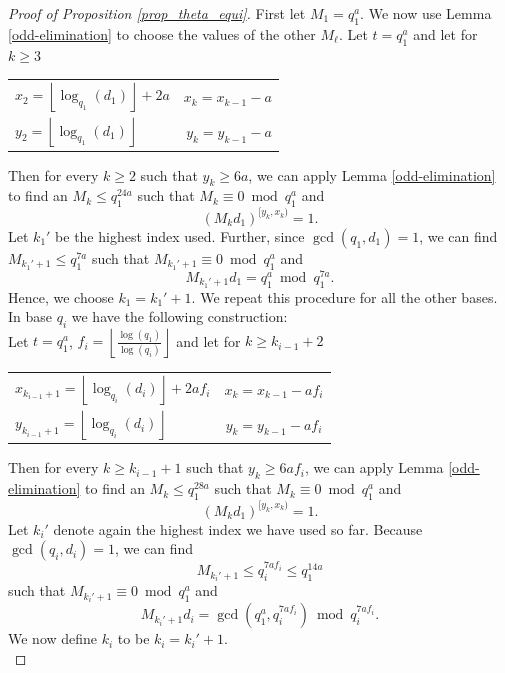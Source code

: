 \documentclass[12pt]{amsart}
\renewcommand{\leq}{\leqslant}
\renewcommand{\geq}{\geqslant}
\theoremstyle{definition}
\numberwithin{equation}{section}
\numberwithin{equation}{section}
\begin{document}
\begin{proof}[Proof of Proposition \ref{prop_theta_equi}]
	First let $M_1=q_1^{a}$. We now use Lemma \ref{odd-elimination} to choose the values of the other $M_{\ell}$. Let $t=q_1^{a}$ and let for $k\geq 3$\\
	\begin{center}
		\begin{tabular}{lr}
			\vspace{3pt}$x_2=\left\lfloor\log_{q_1}(d_1)\right\rfloor + 2a$ & \hspace{10pt} $x_k=x_{k-1}-a$\\
			$y_2=\left\lfloor\log_{q_1}(d_1)\right\rfloor$ & \hspace{10pt} $y_k=y_{k-1}-a$
		\end{tabular}
	\end{center}
	Then for every $k\geq 2$ such that $y_k\geq 6a$, we can apply Lemma \ref{odd-elimination} to find an $M_k\leq q_1^{24a}$ such that $M_k\equiv 0 \bmod q_1^{a}$ and
	\[
		(M_kd_1)^{[y_k,x_k)} = 1.
	\]
	Let $k_1'$ be the highest index used. Further, since $\gcd(q_1,d_1)=1$, we can find $M_{k_1'+1}\leq q_1^{7a}$ such that $M_{k_1'+1}\equiv0\bmod q_1^a$ and 
	\[
		M_{k_1'+1}d_1=q_1^a \bmod q_1^{7a}.
	\]
	Hence, we choose $k_1=k_1'+1$. We repeat this procedure for all the other bases. In base $q_{i}$ we have the following construction:\\
	Let $t=q_1^{a}$, $f_i = \left\lfloor\frac{\log(q_1)}{\log(q_i)}\right\rfloor$ and let for $k\geq k_{i-1}+2$\\
	\begin{center}
		\begin{tabular}{lc}
			\vspace{3pt}$x_{k_{i-1}+1}=\left\lfloor\log_{q_i}(d_i)\right\rfloor + 2af_i$ & $x_k=x_{k-1}-af_i$\\
			$y_{k_{i-1}+1}=\left\lfloor\log_{q_i}(d_i)\right\rfloor$ & $y_k=y_{k-1}-af_i$
		\end{tabular}
	\end{center}
	Then for every $k\geq k_{i-1}+1$ such that $y_k\geq 6af_i$, we can apply Lemma \ref{odd-elimination} to find an $M_k\leq q_1^{28a}$ such that $M_k\equiv 0 \bmod q_1^{a}$ and
	\[
		(M_kd_1)^{[y_k,x_k)} = 1.
	\]
	Let $k_i'$ denote again the highest index we have used so far. Because $\gcd(q_i,d_i)=1$, we can find 
	\[
		M_{k_i'+1}\leq q_i^{7af_i} \leq q_1^{14a}
	\]
	such that $M_{k_i'+1}\equiv0\bmod q_1^a$ and 
	\[
	M_{k_i'+1}d_i=\gcd\left(q_1^a,q_i^{7af_i}\right) \bmod q_i^{7af_i}.
	\]
	We now define $k_i$ to be $k_i=k_i'+1$.\\
	

\end{proof}
\end{document}
